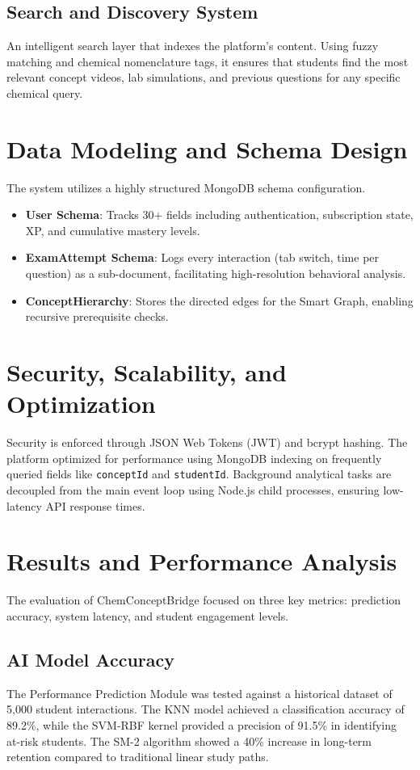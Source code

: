 \documentclass[10pt, conference]{IEEEtran}
\begin{document}
\subsection{Search and Discovery System}
An intelligent search layer that indexes the platform's content. Using fuzzy matching and chemical nomenclature tags, it ensures that students find the most relevant concept videos, lab simulations, and previous questions for any specific chemical query.

\section{Data Modeling and Schema Design}
The system utilizes a highly structured MongoDB schema configuration. 
\begin{itemize}
    \item \textbf{User Schema}: Tracks 30+ fields including authentication, subscription state, XP, and cumulative mastery levels.
    \item \textbf{ExamAttempt Schema}: Logs every interaction (tab switch, time per question) as a sub-document, facilitating high-resolution behavioral analysis.
    \item \textbf{ConceptHierarchy}: Stores the directed edges for the Smart Graph, enabling recursive prerequisite checks.
\end{itemize}

\section{Security, Scalability, and Optimization}
Security is enforced through JSON Web Tokens (JWT) and bcrypt hashing. The platform optimized for performance using MongoDB indexing on frequently queried fields like \texttt{conceptId} and \texttt{studentId}. Background analytical tasks are decoupled from the main event loop using Node.js child processes, ensuring low-latency API response times.

\section{Results and Performance Analysis}
The evaluation of ChemConceptBridge focused on three key metrics: prediction accuracy, system latency, and student engagement levels.

\subsection{AI Model Accuracy}
The Performance Prediction Module was tested against a historical dataset of 5,000 student interactions. The KNN model achieved a classification accuracy of 89.2\%, while the SVM-RBF kernel provided a precision of 91.5\% in identifying at-risk students. The SM-2 algorithm showed a 40\% increase in long-term retention compared to traditional linear study paths.
\end{document}
